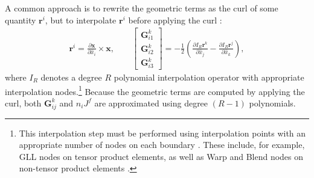 \documentclass[review]{siamart0216}
\theoremstyle{assumption}
\renewcommand{\hat}[1]{\hat{#1}}
\newcommand{\pd}[2]{\frac{\partial#1}{\partial#2}}
\newcommand{\LRp}[1]{\left( #1 \right)}
\newcommand{\LRs}[1]{\left[ #1 \right]}
\renewcommand{\hat}{\widehat}
\begin{document}
A common approach is to rewrite the geometric terms as the curl of some quantity $\bm{r}^i$, but to interpolate $\bm{r}^i$ before applying the curl \cite{visbal2002use, kopriva2006metric, hindenlang2012explicit}:
\begin{align}
\bm{r}^i = { \pd{\bm{x}}{\hat{x}_i}\times \bm{x}}, \qquad
\LRs{\begin{array}{c}
\bm{G}^k_{i1}\\
\bm{G}^k_{i2}\\
\bm{G}^k_{i3}\end{array}} = -\frac{1}{2}\LRp{\pd{I_{R}\bm{r}^k}{\hat{x}_j}-\pd{I_{R}\bm{r}^j}{\hat{x}_k}}, 
\label{eq:iconscurl}
\end{align}
where $I_{R}$ denotes a degree ${R}$ polynomial interpolation operator with appropriate interpolation nodes.\footnote{This interpolation step must be performed using interpolation points with an appropriate number of nodes on each boundary \cite{chan2018discretely}.  These include, for example, GLL nodes on tensor product elements, as well as Warp and Blend nodes on non-tensor product elements \cite{warburton2006explicit, chan2015comparison}.}  Because the geometric terms are computed by applying the curl, both $\bm{G}^k_{ij}$ and $n_iJ^f$ are approximated using degree $(R-1)$ polynomials.  
\end{document}
